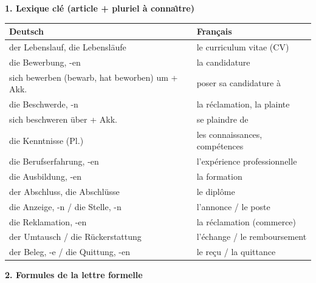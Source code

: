 \documentclass[11pt]{article}
\newcommand{\ière}{\textsuperscript{re}}\newcommand{\ième}{\textsuperscript{e}}
\begin{document}
\begin{bilan}
\textbf{1. Lexique cl\'e (article + pluriel \`a conna\^{\i}tre)}

\begin{center}
\begin{tabularx}{\linewidth}{|X|X|}\hline
\rowcolor{popblueL} \textbf{Deutsch} & \textbf{Fran\c{c}ais} \\ \hline
der Lebenslauf, die Lebensl\"aufe & le curriculum vitae (CV) \\ \hline
die Bewerbung, -en & la candidature \\ \hline
sich bewerben (bewarb, hat beworben) um + Akk. & poser sa candidature \`a \\ \hline
die Beschwerde, -n & la r\'eclamation, la plainte \\ \hline
sich beschweren \"uber + Akk. & se plaindre de \\ \hline
die Kenntnisse (Pl.) & les connaissances, comp\'etences \\ \hline
die Berufserfahrung, -en & l'exp\'erience professionnelle \\ \hline
die Ausbildung, -en & la formation \\ \hline
der Abschluss, die Abschl\"usse & le dipl\^ome \\ \hline
die Anzeige, -n / die Stelle, -n & l'annonce / le poste \\ \hline
die Reklamation, -en & la r\'eclamation (commerce) \\ \hline
der Umtausch / die R\"uckerstattung & l'\'echange / le remboursement \\ \hline
der Beleg, -e / die Quittung, -en & le re\c{c}u / la quittance \\ \hline
\end{tabularx}
\end{center}

\textbf{2. Formules de la lettre formelle}


\end{bilan}
\end{document}
